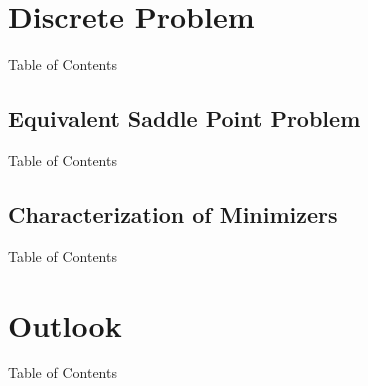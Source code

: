 \documentclass[xcolor=svgnames,english]{beamer}
\newcommand{\cmark}{\ding{51}}%
\newcommand{\xmark}{\ding{55}}%
\newcommand{\done}{\rlap{$\square$}{\raisebox{2pt}{\large\hspace{1pt}\cmark}}%
\hspace{-2.5pt}}
\newcommand{\wontfix}{\rlap{$\square$}{\large\hspace{1pt}\xmark}}
\begin{document}
\section{Discrete Problem}
\begin{frame}{Table of Contents}
\end{frame}

\subsection{Equivalent Saddle Point Problem}
\begin{frame}{Table of Contents}
\end{frame}
\subsection{Characterization of Minimizers}
\begin{frame}{Table of Contents}
\end{frame}

\section{Outlook}
\begin{frame}{Table of Contents}
\end{frame}

%  
\end{document}
